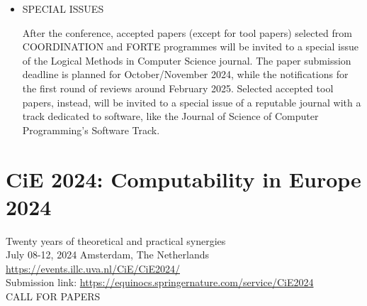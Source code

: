 \documentclass[prodmode,acmtecs]{acmsmall} %
\begin{document}
\begin{itemize}
\item  SPECIAL ISSUES 
 
  After the conference, accepted papers (except for tool papers) selected from COORDINATION and FORTE programmes will be invited to a special issue of the Logical Methods in Computer Science journal. The paper submission deadline is planned for October/November 2024, while the notifications for the first round of reviews around February 2025. Selected accepted tool papers, instead, will be invited to a special issue of a reputable journal with a track dedicated to software, like the Journal of Science of Computer Programming's Software Track. 
 
\end{itemize}\section{CiE 2024: Computability in Europe 2024}\label{CiE2024}  Twenty years of theoretical and practical synergies\\ 
  July 08-12, 2024 Amsterdam, The Netherlands\\ 
  \href{https://events.illc.uva.nl/CiE/CiE2024/}{https://events.illc.uva.nl/CiE/CiE2024/}\\ 
  Submission link: \href{https://equinocs.springernature.com/service/CiE2024}{https://equinocs.springernature.com/service/CiE2024}\\ 
CALL FOR PAPERS 
\end{document}
